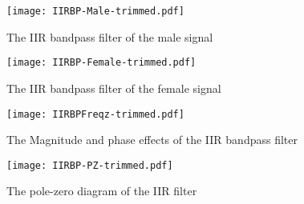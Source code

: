 \begin{figure}[h]
\centering
\texttt{[image: IIRBP-Male-trimmed.pdf]}
\caption{The IIR bandpass filter of the male signal}
\label{fig:IIRBP-male}
\end{figure}

\begin{figure}[h]
\centering
\texttt{[image: IIRBP-Female-trimmed.pdf]}
\caption{The IIR bandpass filter of the female signal}
\label{fig:IIRBP-female}
\end{figure}

\begin{figure}[h]
\centering
\texttt{[image: IIRBPFreqz-trimmed.pdf]}
\caption{The Magnitude and phase effects of the IIR bandpass filter}
\label{fig:IIRBPFreqz}
\end{figure}

\begin{figure}[h]
\centering
\texttt{[image: IIRBP-PZ-trimmed.pdf]}
\caption{The pole-zero diagram of the IIR filter}
\label{fig:IIRBP-PZ}
\end{figure}
